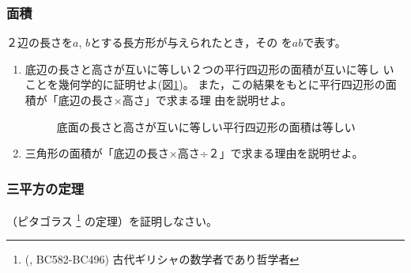\documentclass[twocolumn,11pt]{jarticle}
\begin{document}
\subsubsection{面積}
２辺の長さを$a$, $b$とする長方形が与えられたとき，その
を$ab$で表す。
\begin{enumerate}
\item 底辺の長さと高さが互いに等しい２つの平行四辺形の面積が互いに等し
  いことを幾何学的に証明せよ(図\ref{fig:parallelogram})。
  また，この結果をもとに平行四辺形の面積が「底辺の長さ×高さ」で求まる理
  由を説明せよ。
\begin{figure}[t]
  \begin{center}
    \caption{底面の長さと高さが互いに等しい平行四辺形の面積は等しい}
    \label{fig:parallelogram}
  \end{center}
\end{figure}
\item 三角形の面積が「底辺の長さ×高さ÷２」で求まる理由を説明せよ。
\end{enumerate}

\subsubsection{三平方の定理}
（ピタゴラス
\footnote{(, BC582-BC496)
  古代ギリシャの数学者であり哲学者}
の定理）を証明しなさい。
\end{document}
